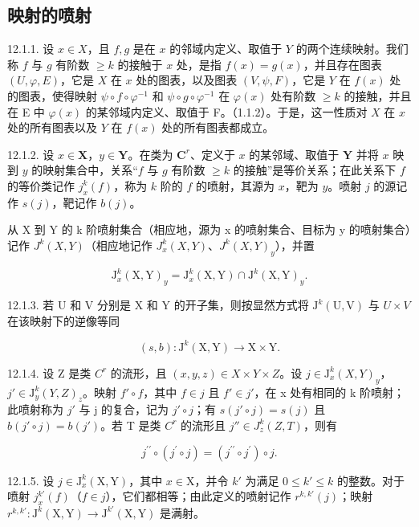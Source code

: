 \subsection{映射的喷射}

12.1.1. 设 \(x \in X\)，且 \(f, g\) 是在 \(x\) 的邻域内定义、取值于 \(Y\) 的两个连续映射。我们称 \(f\) 与 \(g\) 有阶数 \(\geqslant k\) 的接触于 \(x\) 处，是指 \(f(x) = g(x)\)，并且存在图表 \((U, \varphi, E)\)，它是 \(X\) 在 \(x\) 处的图表，以及图表 \((V, \psi, F)\)，它是 \(Y\) 在 \(f(x)\) 处的图表，使得映射 \(\psi \circ f \circ \varphi^{-1}\) 和 \(\psi \circ g \circ \varphi^{-1}\) 在 \(\varphi(x)\) 处有阶数 \(\geqslant k\) 的接触，并且在 E 中 \(\varphi(x)\) 的某邻域内定义、取值于 F。（1.1.2）。于是，这一性质对 \(X\) 在 \(x\) 处的所有图表以及 \(Y\) 在 \(f(x)\) 处的所有图表都成立。

12.1.2. 设 \(x \in \mathbf{X}\)，\(y \in \mathbf{Y}\)。在类为 \(\mathbf{C}^r\)、定义于 \(x\) 的某邻域、取值于 \(\mathbf{Y}\) 并将 \(x\) 映到 \(y\) 的映射集合中，关系“\(f\) 与 \(g\) 有阶数 \(\geqslant k\) 的接触”是等价关系；在此关系下 \(f\) 的等价类记作 \(j_x^k(f)\)，称为 \(k\) 阶的 \(f\) 的喷射，其源为 \(x\)，靶为 \(y\)。喷射 \(j\) 的源记作 \(s(j)\)，靶记作 \(b(j)\)。

从 X 到 Y 的 k 阶喷射集合（相应地，源为 x 的喷射集合、目标为 y 的喷射集合）记作 \(J^{k}(X, Y)\)（相应地记作 \(J_{x}^{k}(X, Y)\)、\(J^{k}(X, Y)_{y}\)），并置

\[
\mathrm{J} _ {x} ^ {k} (\mathrm{X}, \mathrm{Y}) _ {y} = \mathrm{J} _ {x} ^ {k} (\mathrm{X}, \mathrm{Y}) \cap \mathrm{J} ^ {k} (\mathrm{X}, \mathrm{Y}) _ {y}.
\]

12.1.3. 若 U 和 V 分别是 X 和 Y 的开子集，则按显然方式将 \(\mathrm{J}^{k}(\mathrm{U},\mathrm{V})\) 与 \(U \times V\) 在该映射下的逆像等同

\[
(s, b): \mathrm{J} ^ {k} (\mathrm{X}, \mathrm{Y}) \rightarrow \mathrm{X} \times \mathrm{Y}.
\]

12.1.4. 设 Z 是类 \(C^{r}\) 的流形，且 \((x, y, z) \in X \times Y \times Z\)。设 \(j \in \mathrm{J}_{x}^{k}(X, Y)_{y}\)，\(j' \in \mathrm{J}_{y}^{k}(Y, Z)_{z}\)。映射 \(f' \circ f\)，其中 \(f \in j\) 且 \(f' \in j'\)，在 x 处有相同的 k 阶喷射；此喷射称为 \(j'\) 与 j 的复合，记为 \(j' \circ j\)；有 \(s(j' \circ j) = s(j)\) 且 \(b(j' \circ j) = b(j')\)。若 T 是类 \(C^{r}\) 的流形且 \(j'' \in J_{z}^{k}(Z, T)\)，则有

\[
j ^ {\prime \prime} \circ (j ^ {\prime} \circ j) = (j ^ {\prime \prime} \circ j ^ {\prime}) \circ j.
\]

12.1.5. 设 \(j \in \mathrm{J}_x^k(\mathrm{X}, \mathrm{Y})\)，其中 \(x \in \mathrm{X}\)，并令 \(k'\) 为满足 \(0 \leqslant k' \leqslant k\) 的整数。对于喷射 \(j_x^{k'}(f)\)（\(f \in j\)），它们都相等；由此定义的喷射记作 \(r^{k, k'}(j)\)；映射 \(r^{k, k'}: \mathrm{J}^k(\mathrm{X}, \mathrm{Y}) \to \mathrm{J}^{k'}(\mathrm{X}, \mathrm{Y})\) 是满射。

